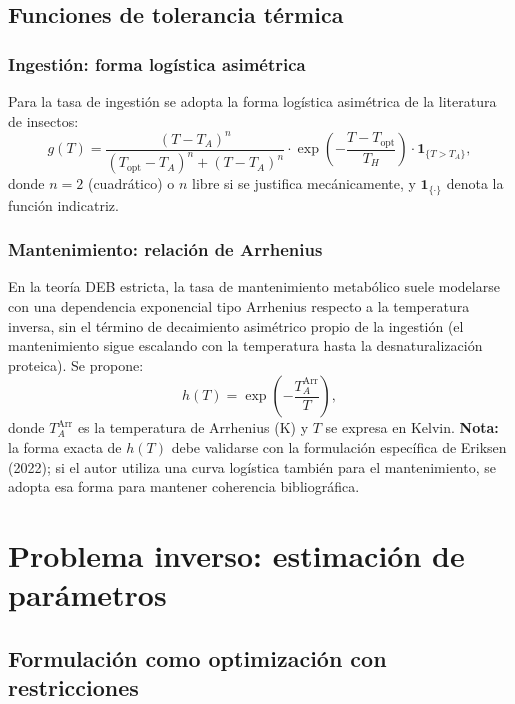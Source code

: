 \subsection{Funciones de tolerancia térmica}

\subsubsection{Ingestión: forma logística asimétrica}

Para la tasa de ingestión se adopta la forma logística asimétrica de la literatura de insectos:
\begin{equation}
\label{eq:thermal_g}
g(T) = \frac{(T - T_A)^n}{(T_{\text{opt}} - T_A)^n + (T - T_A)^n} \cdot \exp\!\left( -\frac{T - T_{\text{opt}}}{T_H} \right) \cdot \mathbf{1}_{\{T > T_A\}},
\end{equation}
donde $n=2$ (cuadrático) o $n$ libre si se justifica mecánicamente, y $\mathbf{1}_{\{\cdot\}}$ denota la función indicatriz.

\subsubsection{Mantenimiento: relación de Arrhenius}

En la teoría DEB estricta, la tasa de mantenimiento metabólico suele modelarse con una dependencia exponencial tipo Arrhenius respecto a la temperatura inversa, sin el término de decaimiento asimétrico propio de la ingestión (el mantenimiento sigue escalando con la temperatura hasta la desnaturalización proteica). Se propone:
\begin{equation}
\label{eq:thermal_h}
h(T) = \exp\!\left( -\frac{T_A^{\text{Arr}}}{T} \right),
\end{equation}
donde $T_A^{\text{Arr}}$ es la temperatura de Arrhenius (K) y $T$ se expresa en Kelvin. \textbf{Nota:} la forma exacta de $h(T)$ debe validarse con la formulación específica de Eriksen (2022); si el autor utiliza una curva logística también para el mantenimiento, se adopta esa forma para mantener coherencia bibliográfica.

\section{Problema inverso: estimación de parámetros}

\subsection{Formulación como optimización con restricciones}

